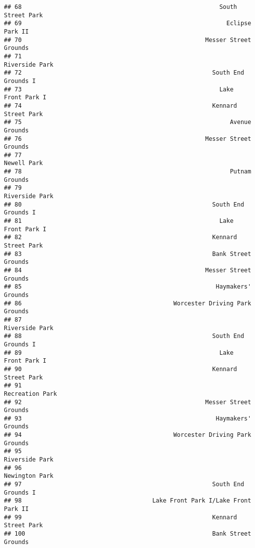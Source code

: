\documentclass[]{article}
\begin{document}
\begin{verbatim}
## 68                                                        South Street Park
## 69                                                          Eclipse Park II
## 70                                                    Messer Street Grounds
## 71                                                           Riverside Park
## 72                                                      South End Grounds I
## 73                                                        Lake Front Park I
## 74                                                      Kennard Street Park
## 75                                                           Avenue Grounds
## 76                                                    Messer Street Grounds
## 77                                                              Newell Park
## 78                                                           Putnam Grounds
## 79                                                           Riverside Park
## 80                                                      South End Grounds I
## 81                                                        Lake Front Park I
## 82                                                      Kennard Street Park
## 83                                                      Bank Street Grounds
## 84                                                    Messer Street Grounds
## 85                                                       Haymakers' Grounds
## 86                                           Worcester Driving Park Grounds
## 87                                                           Riverside Park
## 88                                                      South End Grounds I
## 89                                                        Lake Front Park I
## 90                                                      Kennard Street Park
## 91                                                          Recreation Park
## 92                                                    Messer Street Grounds
## 93                                                       Haymakers' Grounds
## 94                                           Worcester Driving Park Grounds
## 95                                                           Riverside Park
## 96                                                           Newington Park
## 97                                                      South End Grounds I
## 98                                     Lake Front Park I/Lake Front Park II
## 99                                                      Kennard Street Park
## 100                                                     Bank Street Grounds

\end{verbatim}
\end{document}
